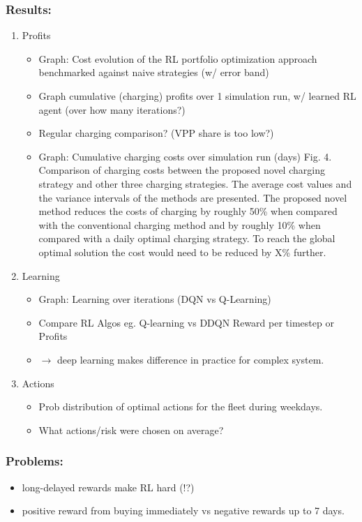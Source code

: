 \documentclass[a4paper, 12pt]{article}
\let\cite\shortcite
\begin{document}
\subsubsection{Results:}
\label{sec:orgcc00f43}
\begin{enumerate}
\item Profits
\begin{itemize}
\item Graph: Cost evolution of the RL portfolio optimization approach benchmarked
against naive strategies (w/ error band)
\item Graph cumulative (charging) profits over 1 simulation run, w/ learned RL agent (over
how many iterations?)
\item Regular charging comparison? (VPP share is too low?)
\item Graph: Cumulative charging costs over simulation run (days)
Fig. 4. Comparison of charging costs between the proposed novel charging
strategy and other three charging strategies. The average cost values and the
variance intervals of the methods are presented. The proposed novel method
reduces the costs of charging by roughly 50\% when compared with the
conventional charging method and by roughly 10\% when compared with a
daily optimal charging strategy. To reach the global optimal solution the cost
would need to be reduced by X\% further.
\end{itemize}

\item Learning
\begin{itemize}
\item Graph: Learning over iterations (DQN vs Q-Learning)
\item Compare RL Algos eg. Q-learning vs DDQN  Reward per timestep or Profits
\item \(\rightarrow\) deep learning makes difference in practice for complex system.
\end{itemize}

\item Actions
\begin{itemize}
\item Prob distribution of optimal actions for the fleet during weekdays. \cite{vaya14_optim}
\item What actions/risk were chosen on average?
\end{itemize}
\end{enumerate}

\subsubsection{Problems:}
\label{sec:org1fe056e}
\begin{itemize}
\item long-delayed rewards make RL hard (!?)
\item positive reward from buying immediately vs negative rewards up to 7 days.
\end{itemize}
\end{document}
